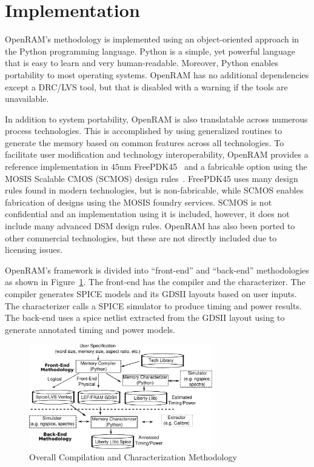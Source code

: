\section{Implementation}
\label{sec:implementation}

OpenRAM's methodology is implemented using an object-oriented approach
in the Python programming language. Python is a simple, yet powerful
language that is easy to learn and very human-readable. Moreover, Python
enables portability to most operating systems. OpenRAM has no additional
dependencies except a DRC/LVS tool, but that is disabled with a
warning if the tools are unavailable.

In addition to system portability, OpenRAM is also translatable across
numerous process technologies. This is accomplished by using
generalized routines to generate the memory based on common features
across all technologies. To facilitate user modification and
technology interoperability, OpenRAM provides a reference implementation in
$45$nm FreePDK45~\cite{4231502} and a fabricable option using the
MOSIS Scalable CMOS (SCMOS) design rules~\cite{scmos}. FreePDK45 uses
many design rules found in modern technologies, but is non-fabricable,
while SCMOS enables fabrication of designs using the MOSIS foundry
services. SCMOS is not confidential and an implementation using it is
included, however, it does not include many advanced DSM design
rules. OpenRAM has also been ported to other commercial technologies,
but these are not directly included due to licensing issues.

OpenRAM's framework is divided into \enquote{front-end} and \enquote{back-end}
methodologies as shown in Figure~\ref{fig:methodology}. The front-end
has the compiler and the characterizer. The compiler generates
SPICE models and its GDSII layouts based on user inputs. The
characterizer calls a SPICE simulator to produce timing and power
results. The back-end uses a spice netlist extracted from the GDSII
layout using to generate annotated timing and power models.

\begin{figure}[tb]
\centering
\includegraphics[width=8cm]{./figs/methodology.pdf}
\caption{Overall Compilation and Characterization Methodology}
\label{fig:methodology}
\end{figure}

